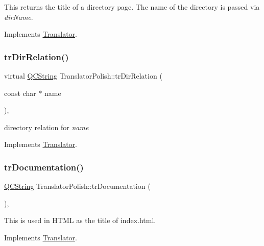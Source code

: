 This returns the title of a directory page. The name of the directory is passed via {\itshape dir\+Name}. 

Implements \mbox{\hyperlink{class_translator}{Translator}}.

\mbox{\label{class_translator_polish_a6eb8a9fe3923141fb898a3973c113f40}} 
\subsubsection{\texorpdfstring{trDirRelation()}{trDirRelation()}}
{\footnotesize\ttfamily virtual \mbox{\hyperlink{class_q_c_string}{Q\+C\+String}} Translator\+Polish\+::tr\+Dir\+Relation (\begin{DoxyParamCaption}\item[{const char $\ast$}]{name }\end{DoxyParamCaption})\hspace{0.3cm}{\ttfamily [inline]}, {\ttfamily [virtual]}}

directory relation for {\itshape name} 

Implements \mbox{\hyperlink{class_translator}{Translator}}.

\mbox{\label{class_translator_polish_a759d797ca0201586919dd0d6fc9e781c}} 
\subsubsection{\texorpdfstring{trDocumentation()}{trDocumentation()}}
{\footnotesize\ttfamily \mbox{\hyperlink{class_q_c_string}{Q\+C\+String}} Translator\+Polish\+::tr\+Documentation (\begin{DoxyParamCaption}{ }\end{DoxyParamCaption})\hspace{0.3cm}{\ttfamily [inline]}, {\ttfamily [virtual]}}

This is used in H\+T\+ML as the title of index.\+html. 

Implements \mbox{\hyperlink{class_translator}{Translator}}.

\mbox{\label{class_translator_polish_a06464fe1c54e08523ce645256523dc8c}} 
